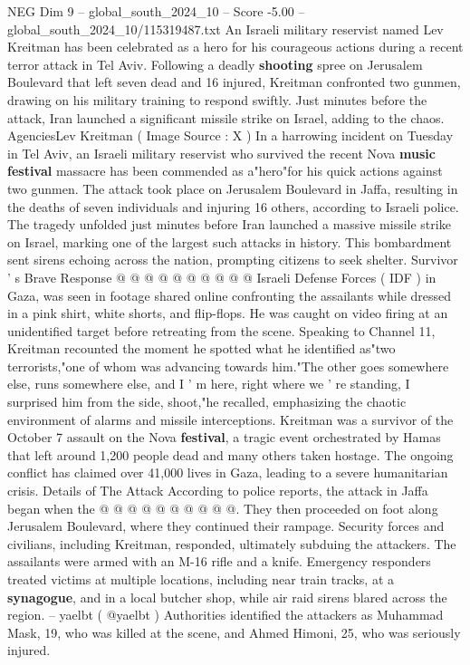 \begin{textsample}{NEG Dim 9 – global\_south\_2024\_10 – Score -5.00 – global\_south\_2024\_10/115319487.txt}  \label{ex:f9_neg_279}
An Israeli military reservist named Lev Kreitman has been celebrated as a hero for his courageous actions during a recent terror attack in Tel Aviv.
Following a deadly \textbf{shooting} spree on Jerusalem Boulevard that left seven dead and 16 injured, Kreitman confronted two gunmen, drawing on his military training to respond swiftly.
Just minutes before the attack, Iran launched a significant missile strike on Israel, adding to the chaos.
AgenciesLev Kreitman ( Image Source : X ) In a harrowing incident on Tuesday in Tel Aviv, an Israeli military reservist who survived the recent Nova \textbf{music} \textbf{festival} massacre has been commended as a"hero"for his quick actions against two gunmen.
The attack took place on Jerusalem Boulevard in Jaffa, resulting in the deaths of seven individuals and injuring 16 others, according to Israeli police.
The tragedy unfolded just minutes before Iran launched a massive missile strike on Israel, marking one of the largest such attacks in history.
This bombardment sent sirens echoing across the nation, prompting citizens to seek shelter.
Survivor ' s Brave Response @ @ @ @ @ @ @ @ @ @ Israeli Defense Forces ( IDF ) in Gaza, was seen in footage shared online confronting the assailants while dressed in a pink shirt, white shorts, and flip-flops.
He was caught on video firing at an unidentified target before retreating from the scene.
Speaking to Channel 11, Kreitman recounted the moment he spotted what he identified as"two terrorists,"one of whom was advancing towards him."The other goes somewhere else, runs somewhere else, and I ' m here, right where we ' re standing, I surprised him from the side, shoot,"he recalled, emphasizing the chaotic environment of alarms and missile interceptions.
Kreitman was a survivor of the October 7 assault on the Nova \textbf{festival}, a tragic event orchestrated by Hamas that left around 1,200 people dead and many others taken hostage.
The ongoing conflict has claimed over 41,000 lives in Gaza, leading to a severe humanitarian crisis.
Details of The Attack According to police reports, the attack in Jaffa began when the @ @ @ @ @ @ @ @ @ @.
They then proceeded on foot along Jerusalem Boulevard, where they continued their rampage.
Security forces and civilians, including Kreitman, responded, ultimately subduing the attackers.
The assailants were armed with an M-16 rifle and a knife.
Emergency responders treated victims at multiple locations, including near train tracks, at a \textbf{synagogue}, and in a local butcher shop, while air raid sirens blared across the region. -- yaelbt ( @yaelbt ) Authorities identified the attackers as Muhammad Mask, 19, who was killed at the scene, and Ahmed Himoni, 25, who was seriously injured.

\end{textsample}
